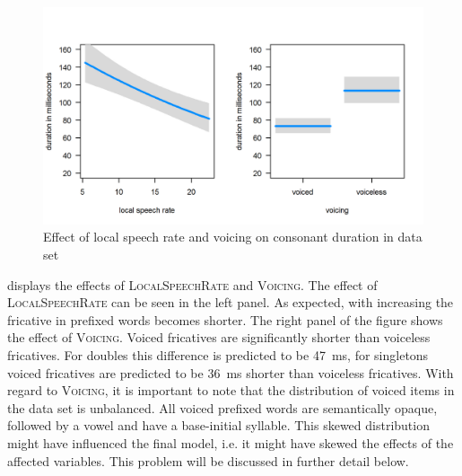 \begin{figure}
	
	\includegraphics[scale=.8] {images/Corpus/disModelcov.png}
	\caption{ Effect of local speech rate and voicing on consonant duration in data set}
	\label{fig:corpus covariates dis}
\end{figure}


 displays the effects of \textsc{LocalSpeechRate} and \textsc{Voicing}. The effect of \textsc{LocalSpeechRate} can be seen in the left panel. As expected, with increasing  the fricative in prefixed words becomes shorter. 
The right panel of the figure shows the effect of \textsc{Voicing}. Voiced fricatives are significantly shorter than voiceless fricatives. For doubles this difference is predicted to be 47~ms, for singletons voiced fricatives are predicted to be 36~ms shorter than voiceless fricatives. 
With regard to \textsc{Voicing}, it is important to note that the distribution of voiced items in the data set is unbalanced. All voiced prefixed words are semantically opaque, followed by a vowel and have a  base-initial syllable. This skewed distribution might have influenced the final model, i.e. it might have skewed the effects of the affected variables. This problem will be discussed in further detail below.

